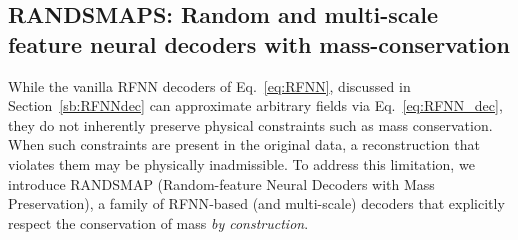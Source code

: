 \documentclass{article}
\begin{document}

\subsection{RANDSMAPS: Random and multi-scale feature neural decoders with mass-conservation} \label{sb:RANDSMAP}

While the vanilla RFNN decoders of Eq.~\eqref{eq:RFNN}, discussed in Section~\ref{sb:RFNNdec} can approximate arbitrary fields via Eq.~\eqref{eq:RFNN_dec}, they do not inherently preserve physical constraints such as mass conservation. When such constraints are present in the original data, a reconstruction that violates them may be physically inadmissible. To address this limitation, we introduce RANDSMAP (Random-feature Neural Decoders with Mass Preservation), a family of RFNN‑based (and multi-scale) decoders that explicitly respect the conservation of mass \emph{by construction}. 
\end{document}
